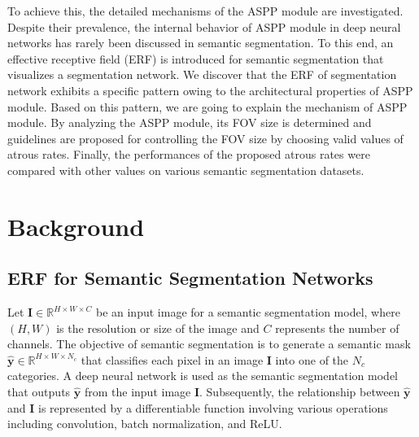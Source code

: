 \documentclass{article}
\newcommand{\R}{\mathbb{R}}
\newcommand{\bI}{\mathbf{I}}
\newcommand{\hby}{\hat{\mathbf{y}}}
\begin{document}
To achieve this, the detailed mechanisms of the ASPP module are investigated. Despite their prevalence, the internal behavior of ASPP module in deep neural networks has rarely been discussed in semantic segmentation. To this end, an effective receptive field (ERF) is introduced for semantic segmentation that visualizes a segmentation network. We discover that the ERF of segmentation network exhibits a specific pattern owing to the architectural properties of ASPP module. Based on this pattern, we are going to explain the mechanism of ASPP module. By analyzing the ASPP module, its FOV size is determined and guidelines are proposed for controlling the FOV size by choosing valid values of atrous rates. Finally, the performances of the proposed atrous rates were compared with other values on various semantic segmentation datasets.



\section{Background}
\label{sec:back}

\subsection{ERF for Semantic Segmentation Networks}
Let $\bI \in \R^{H \times W \times C}$ be an input image for a semantic segmentation model, where $(H, W)$ is the resolution or size of the image and $C$ represents the number of channels. The objective of semantic segmentation is to generate a semantic mask $\hby \in \R^{H \times W \times N_c}$ that classifies each pixel in an image $\bI$ into one of the $N_c$ categories. A deep neural network is used as the semantic segmentation model that outputs $\hby$ from the input image $\bI$. Subsequently, the relationship between $\hby$ and $\bI$ is represented by a differentiable function involving various operations including convolution, batch normalization, and ReLU.
\end{document}
